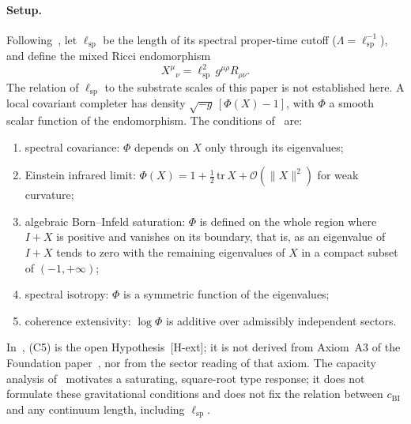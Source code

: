   \paragraph{Setup.}
    Following~\cite{Beau2026h}, let $\ell_{\mathrm{sp}}$ be the length of its spectral proper-time cutoff
    ($\Lambda = \ell_{\mathrm{sp}}^{-1}$), and define the mixed Ricci endomorphism
    \begin{equation}
      X^{\mu}{}_{\nu} = \ell_{\mathrm{sp}}^{2}\, g^{\mu\rho} R_{\rho\nu}.
      \label{eq:BI-mixed-ricci}
    \end{equation}
    The relation of $\ell_{\mathrm{sp}}$ to the substrate scales of this paper is not established here.
    A local covariant completer has density $\sqrt{-g}\,[\Phi(X) - 1]$, with $\Phi$ a smooth scalar function of the
    endomorphism.
    The conditions of~\cite{Beau2026h} are:
    \begin{enumerate}[label=(C\arabic*)]
      \item spectral covariance: $\Phi$ depends on $X$ only through its eigenvalues;
      \item Einstein infrared limit: $\Phi(X) = 1 + \tfrac12\,\mathrm{tr}\,X + \mathcal{O}(\|X\|^2)$ for weak
      curvature;
      \item algebraic Born--Infeld saturation: $\Phi$ is defined on the whole region where $I + X$ is positive and
      vanishes on its boundary, that is, as an eigenvalue of $I + X$ tends to zero with the remaining eigenvalues of
      $X$ in a compact subset of $(-1, +\infty)$;
      \item spectral isotropy: $\Phi$ is a symmetric function of the eigenvalues;
      \item coherence extensivity: $\log\Phi$ is additive over admissibly independent sectors.
    \end{enumerate}
    In~\cite{Beau2026h}, (C5) is the open Hypothesis~[H-ext]; it is not derived from Axiom~A3 of the
    Foundation paper~\cite{Beau2026m}, nor from the sector reading of that axiom.
    The capacity analysis of~\cite{Beau2026c} motivates a saturating, square-root type response; it does not
    formulate these gravitational conditions and does not fix the relation between $c_{\mathrm{BI}}$ and any
    continuum length, including $\ell_{\mathrm{sp}}$.


